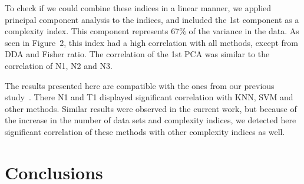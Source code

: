\documentclass[10pt]{bmc_article}
\newenvironment{bmcformat}{\begin{raggedright}\baselineskip20pt\sloppy\setboolean{publ}{false}}{\end{raggedright}\baselineskip20pt\sloppy}
\begin{document}
\begin{bmcformat}
To check if we could combine these indices in a linear manner, we
applied principal component analysis to the indices, and included the
1st component as a complexity index. This component represents 67$\%$
of the variance in the data. As seen in Figure~2, this index had a
high correlation with all methods, except from DDA and Fisher
ratio. The correlation of the 1st PCA was similar to the correlation
of N1, N2 and N3. 


The results presented here are compatible with the ones from our
previous study~\cite{Costa2009b}. There N1 and T1 displayed
significant correlation with KNN, SVM and other methods. Similar
results were observed in the current work, but because of the increase
in the number of data sets and complexity indices, we detected here
significant correlation of these methods with other complexity indices
as well.





\section*{Conclusions}



\end{bmcformat}
\end{document}
